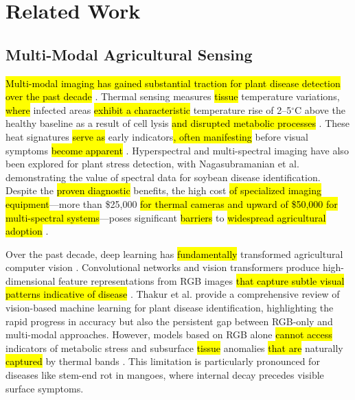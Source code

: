\documentclass[utf8]{FrontiersinHarvard}
\newenvironment{revblock}{}{}
\begin{document}
\section{Related Work}

\subsection{Multi-Modal Agricultural Sensing}
\hl{Multi-modal imaging has gained substantial traction for plant disease detection over the past decade} \cite{maimaitijiang2020,lu2020}. Thermal sensing measures \hl{tissue} temperature variations, \hl{where} infected areas \hl{exhibit a characteristic} temperature rise of 2--5$^{\circ}$C above the healthy baseline as a result of cell lysis \hl{and disrupted metabolic processes} \cite{mahlein2016}. These heat signatures \hl{serve as} early indicators\hl{, often manifesting} before visual symptoms \hl{become apparent} \cite{pineda2021}. \begin{revblock}Hyperspectral and multi-spectral imaging have also been explored for plant stress detection, with Nagasubramanian et al. \cite{nagasubramanian2019} demonstrating the value of spectral data for soybean disease identification.\end{revblock} Despite the \hl{proven diagnostic} benefits, the high cost \hl{of specialized imaging equipment}---more than \$25,000 \hl{for thermal cameras and upward of \$50,000 for multi-spectral systems}---poses significant \hl{barriers} to \hl{widespread agricultural adoption} \cite{sishodia2020}.

Over the past decade, deep learning has \hl{fundamentally} transformed agricultural computer vision \cite{kamilaris2018,coulibaly2022}. Convolutional networks and vision transformers produce high-dimensional feature representations from RGB images \hl{that capture subtle visual patterns indicative of disease} \cite{dosovitskiy2021,liu2022convnext}. \begin{revblock}Thakur et al. \cite{thakur2022} provide a comprehensive review of vision-based machine learning for plant disease identification, highlighting the rapid progress in accuracy but also the persistent gap between RGB-only and multi-modal approaches.\end{revblock} However, models based on RGB alone \hl{cannot access} indicators of metabolic stress and subsurface \hl{tissue} anomalies \hl{that are} naturally \hl{captured} by thermal bands \cite{lu2020,pineda2021}. \begin{revblock}This limitation is particularly pronounced for diseases like stem-end rot in mangoes, where internal decay precedes visible surface symptoms.\end{revblock}
\end{document}
